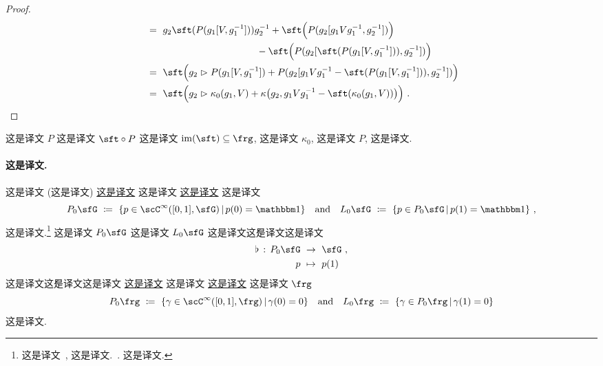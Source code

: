\documentclass[
    affil-it, %
    auth-lg, %
    british, %
    compression, %
    contents, %
    custom-packages={}, %
    references={bigone}, %
]{lib/preprint}
\newcommand{\boundary}{\flat}
\begin{document}
\begin{body}
\begin{proof}
\begin{equation}
\begin{aligned}
                    \ &=\ g_2\sft(P(g_1[V,g_1^{-1}]))g_2^{-1}+\sft\Big(P(g_2[g_1Vg^{-1}_1,g^{-1}_2])\Big)
                    \\
                    &\hspace{4cm}-\sft\Big(P(g_2[\sft(P(g_1[V,g_1^{-1}])),g^{-1}_2])\Big)
                    \\
                    \ &=\ \sft\Big(g_2\acton P(g_1[V,g_1^{-1}])+P(g_2[g_1Vg^{-1}_1-\sft(P(g_1[V,g_1^{-1}])),g^{-1}_2])\Big)
                    \\
					\ &=\ \sft\Big( g_2\acton\kappa_0(g_1,V)+\kappa\big(g_2,g_1Vg^{-1}_1-\sft(\kappa_0(g_1,V))\big)\Big)~.
				\end{aligned}
			\end{equation}
        \end{proof}
这是译文 $P$ 这是译文 $\sft\circ P$ 这是译文 $\im(\sft)\subseteq\frg$, 这是译文 $\kappa_0$, 这是译文 $P$, 这是译文.

        \paragraph{这是译文.}
这是译文 (这是译文) \uline{这是译文} 这是译文 \uline{这是译文} 这是译文 
        \begin{equation}\label{eq:basedPathLoopGroups}
            P_0\sfG\ \coloneqq\ \{p\in\scC^\infty([0,1],\sfG)\,|\,p(0)=\unit\}
            \eand
            L_0\sfG\ \coloneqq\ \{p \in P_0\sfG\,|\,p(1)=\unit\}~,
        \end{equation}  这是译文.\footnote{这是译文~\cite{Baez:2005sn}, 这是译文.~\cite{Schreiber:0705.0452}. 这是译文.} 这是译文 $P_0\sfG$ 这是译文 $L_0\sfG$ 这是译文{\'这是译文}这是译文         \begin{equation}\label{eq:endpointEvaluation}
            \begin{aligned}
                \boundary\,:\,P_0\sfG\ &\rightarrow\ \sfG~,
                \\
                p\ &\mapsto\ p(1)
            \end{aligned}
        \end{equation}  这是译文{\'这是译文}这是译文 \uline{这是译文} 这是译文 \uline{这是译文} 这是译文 $\frg$         \begin{equation}
            P_0\frg\ \coloneqq\ \{\gamma\in\scC^\infty([0,1],\frg)\,|\,\gamma(0)=0\}\eand
            L_0\frg\ \coloneqq\ \{\gamma\in P_0\frg\,|\,\gamma(1)=0\}
        \end{equation}  这是译文. 
        

\end{body}
\end{document}
